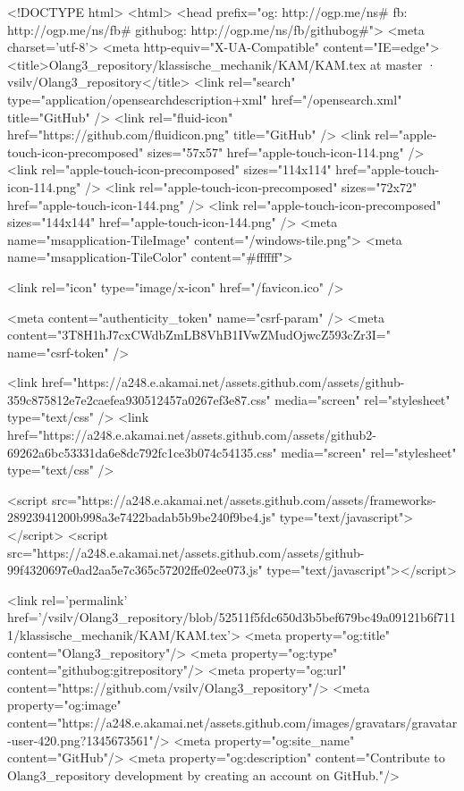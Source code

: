   


<!DOCTYPE html>
<html>
  <head prefix="og: http://ogp.me/ns# fb: http://ogp.me/ns/fb# githubog: http://ogp.me/ns/fb/githubog#">
    <meta charset='utf-8'>
    <meta http-equiv="X-UA-Compatible" content="IE=edge">
        <title>Olang3_repository/klassische_mechanik/KAM/KAM.tex at master · vsilv/Olang3_repository</title>
    <link rel="search" type="application/opensearchdescription+xml" href="/opensearch.xml" title="GitHub" />
    <link rel="fluid-icon" href="https://github.com/fluidicon.png" title="GitHub" />
    <link rel="apple-touch-icon-precomposed" sizes="57x57" href="apple-touch-icon-114.png" />
    <link rel="apple-touch-icon-precomposed" sizes="114x114" href="apple-touch-icon-114.png" />
    <link rel="apple-touch-icon-precomposed" sizes="72x72" href="apple-touch-icon-144.png" />
    <link rel="apple-touch-icon-precomposed" sizes="144x144" href="apple-touch-icon-144.png" />
    <meta name="msapplication-TileImage" content="/windows-tile.png">
    <meta name="msapplication-TileColor" content="#ffffff">

    
    
    <link rel="icon" type="image/x-icon" href="/favicon.ico" />

    <meta content="authenticity_token" name="csrf-param" />
<meta content="3T8H1hJ7cxCWdbZmLB8VhB1IVwZMudOjwcZ593cZr3I=" name="csrf-token" />

    <link href="https://a248.e.akamai.net/assets.github.com/assets/github-359c875812e7e2caefea930512457a0267ef3e87.css" media="screen" rel="stylesheet" type="text/css" />
    <link href="https://a248.e.akamai.net/assets.github.com/assets/github2-69262a6bc53331da6e8dc792fc1ce3b074c54135.css" media="screen" rel="stylesheet" type="text/css" />
    


    <script src="https://a248.e.akamai.net/assets.github.com/assets/frameworks-28923941200b998a3e7422badab5b9be240f9be4.js" type="text/javascript"></script>
    <script src="https://a248.e.akamai.net/assets.github.com/assets/github-99f4320697e0ad2aa5e7c365c57202ffe02ee073.js" type="text/javascript"></script>
    

      <link rel='permalink' href='/vsilv/Olang3_repository/blob/52511f5fdc650d3b5bef679bc49a09121b6f7111/klassische_mechanik/KAM/KAM.tex'>
    <meta property="og:title" content="Olang3_repository"/>
    <meta property="og:type" content="githubog:gitrepository"/>
    <meta property="og:url" content="https://github.com/vsilv/Olang3_repository"/>
    <meta property="og:image" content="https://a248.e.akamai.net/assets.github.com/images/gravatars/gravatar-user-420.png?1345673561"/>
    <meta property="og:site_name" content="GitHub"/>
    <meta property="og:description" content="Contribute to Olang3_repository development by creating an account on GitHub."/>

